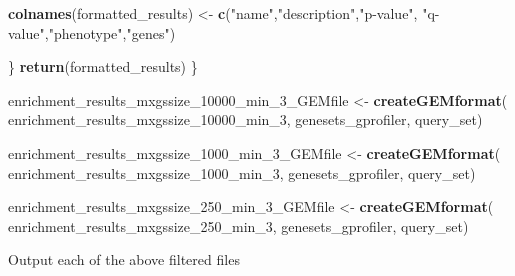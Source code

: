 \documentclass[
]{book}
\newenvironment{Shaded}{\begin{snugshade}}{\end{snugshade}}
\newcommand{\FunctionTok}[1]{\textcolor[rgb]{0.13,0.29,0.53}{\textbf{#1}}}
\newcommand{\NormalTok}[1]{#1}
\newcommand{\OtherTok}[1]{\textcolor[rgb]{0.56,0.35,0.01}{#1}}
\newcommand{\StringTok}[1]{\textcolor[rgb]{0.31,0.60,0.02}{#1}}
\begin{document}
\begin{Shaded}
\begin{Highlighting}[]
          \FunctionTok{colnames}\NormalTok{(formatted\_results) }\OtherTok{\textless{}{-}} \FunctionTok{c}\NormalTok{(}\StringTok{"name"}\NormalTok{,}\StringTok{"description"}\NormalTok{,}\StringTok{"p{-}value"}\NormalTok{,}
                                           \StringTok{"q{-}value"}\NormalTok{,}\StringTok{"phenotype"}\NormalTok{,}\StringTok{"genes"}\NormalTok{)}
          
\NormalTok{  \}}
  \FunctionTok{return}\NormalTok{(formatted\_results)}
\NormalTok{\}}
\end{Highlighting}
\end{Shaded}

\begin{Shaded}
\begin{Highlighting}[]
\NormalTok{enrichment\_results\_mxgssize\_10000\_min\_3\_GEMfile }\OtherTok{\textless{}{-}} \FunctionTok{createGEMformat}\NormalTok{(}
\NormalTok{  enrichment\_results\_mxgssize\_10000\_min\_3, genesets\_gprofiler, query\_set)}

\NormalTok{enrichment\_results\_mxgssize\_1000\_min\_3\_GEMfile }\OtherTok{\textless{}{-}} \FunctionTok{createGEMformat}\NormalTok{(}
\NormalTok{  enrichment\_results\_mxgssize\_1000\_min\_3, genesets\_gprofiler, query\_set)}

\NormalTok{enrichment\_results\_mxgssize\_250\_min\_3\_GEMfile }\OtherTok{\textless{}{-}} \FunctionTok{createGEMformat}\NormalTok{(}
\NormalTok{  enrichment\_results\_mxgssize\_250\_min\_3, genesets\_gprofiler, query\_set)}
\end{Highlighting}
\end{Shaded}

Output each of the above filtered files
\end{document}
